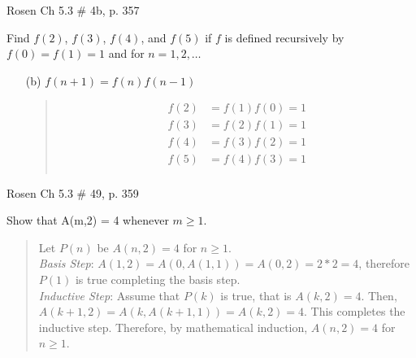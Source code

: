 \documentclass[12pt,addpoints]{exam}
\begin{document}
\begin{questions}
\question Rosen Ch 5.3 \# 4b, p. 357
    \ifprintanswers
        \vspace{-10pt}
   \fi
\begin{solution}
Find $f(2)$, $f(3)$, $f(4)$, and $f(5)$ if $f$ is defined
recursively by $f(0) = f(1) = 1$ and for $n=1,2,\ldots$
\begin{itemize}
    \item[(b)] $f(n+1) = f(n)f(n-1)$
    \begin{quote}
    \begin{align*}
        f(2) &= f(1)f(0) = 1 \\
        f(3) &= f(2)f(1) = 1 \\
        f(4) &= f(3)f(2) = 1 \\
        f(5) &= f(4)f(3) = 1 \\
    \end{align*}
    \end{quote}
\end{itemize}
\end{solution}


\question Rosen Ch 5.3 \# 49, p. 359
    \ifprintanswers
        \vspace{-10pt}
   \fi
\begin{solution}
 Show that A(m,2) = 4 whenever
$m \geq 1$.
\begin{quote}
    Let $P(n)$ be $A(n,2) = 4$ for $n \geq 1$. \\
    \textit{Basis Step}: $A(1,2) = A(0,A(1,1)) = A(0,2) = 2*2 = 4$, therefore $P(1)$ is true completing the basis step. \\
    \textit{Inductive Step}: Assume that $P(k)$ is true, that is $A(k,2) = 4$.  Then, $A(k+1,2) = A(k,A(k+1,1)) = A(k,2) = 4$.  This completes the inductive step.  Therefore, by mathematical induction, $A(n,2) = 4$ for $n \geq 1$.
\end{quote}
\end{solution}

\end{questions}
\end{document}

